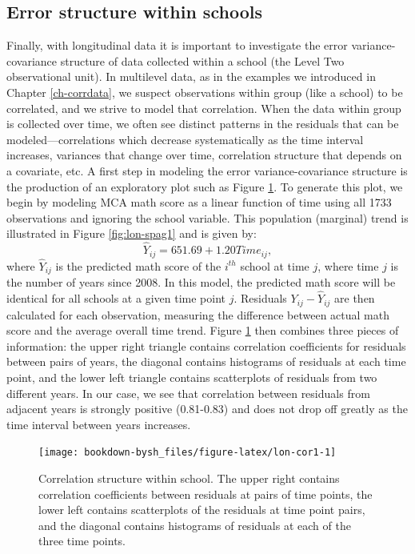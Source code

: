 \documentclass[
]{krantz}
\begin{document}
\hypertarget{lineartwostageerror}{%
\subsection{Error structure within schools}\label{lineartwostageerror}}

Finally, with longitudinal data it is important to investigate the error variance-covariance structure of data collected within a school (the Level Two observational unit). In multilevel data, as in the examples we introduced in Chapter \ref{ch-corrdata}, we suspect observations within group (like a school) to be correlated, and we strive to model that correlation. When the data within group is collected over time, we often see distinct patterns in the residuals that can be modeled---correlations which decrease systematically as the time interval increases, variances that change over time, correlation structure that depends on a covariate, etc. A first step in modeling the error variance-covariance structure is the production of an exploratory plot such as Figure \ref{fig:lon-cor1}. To generate this plot, we begin by modeling MCA math score as a linear function of time using all 1733 observations and ignoring the school variable. This population (marginal) trend is illustrated in Figure \ref{fig:lon-spag1} and is given by:
\begin{equation}
\hat{Y}_{ij}=651.69+1.20\textstyle{Time}_{ij},
\label{eq:overalltrend}
\end{equation}
where \(\hat{Y}_{ij}\) is the predicted math score of the \(i^{th}\) school at time \(j\), where time \(j\) is the number of years since 2008. In this model, the predicted math score will be identical for all schools at a given time point \(j\). Residuals \(Y_{ij}-\hat{Y}_{ij}\) are then calculated for each observation, measuring the difference between actual math score and the average overall time trend. Figure \ref{fig:lon-cor1} then combines three pieces of information: the upper right triangle contains correlation coefficients for residuals between pairs of years, the diagonal contains histograms of residuals at each time point, and the lower left triangle contains scatterplots of residuals from two different years. In our case, we see that correlation between residuals from adjacent years is strongly positive (0.81-0.83) and does not drop off greatly as the time interval between years increases.

\begin{figure}

{\centering \texttt{[image: bookdown-bysh\_files/figure-latex/lon-cor1-1]} 

}

\caption{Correlation structure within school.  The upper right contains correlation coefficients between residuals at pairs of time points, the lower left contains scatterplots of the residuals at time point pairs, and the diagonal contains histograms of residuals at each of the three time points.}\label{fig:lon-cor1}
\end{figure}
\end{document}
